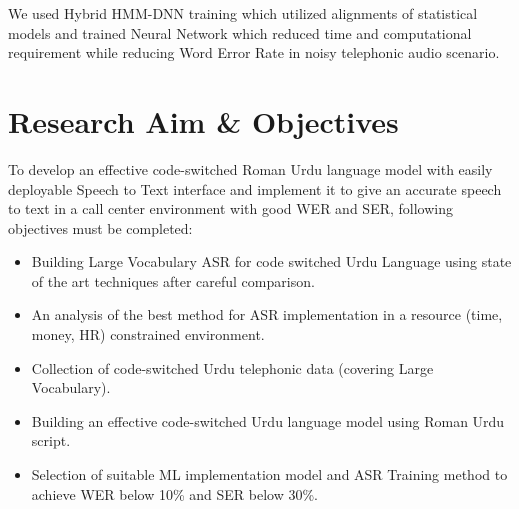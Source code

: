 We used Hybrid HMM-DNN training which utilized alignments of statistical models and trained Neural Network which reduced time and computational requirement \cite{naeem_subspace_2020} while reducing Word Error Rate in noisy telephonic audio scenario.

\section{Research Aim \& Objectives} %
\label{sub:research-aim}
To develop an effective code-switched Roman Urdu language model with easily deployable Speech to Text interface and implement it to give an accurate speech to text in a call center environment with good WER and 
SER, following objectives must be completed:


\begin{itemize}
    \item Building Large Vocabulary ASR for code switched Urdu Language using state of the art techniques after careful comparison. %
    \item An analysis of the best method for ASR implementation in a resource (time, money, HR) constrained environment.
    \item Collection of code-switched Urdu telephonic data (covering Large Vocabulary).
    \item Building an effective code-switched Urdu language model using Roman Urdu script.   
    \item Selection of suitable ML implementation model and ASR Training method to achieve WER below 10\% and SER below 30\%.%
\end{itemize}

